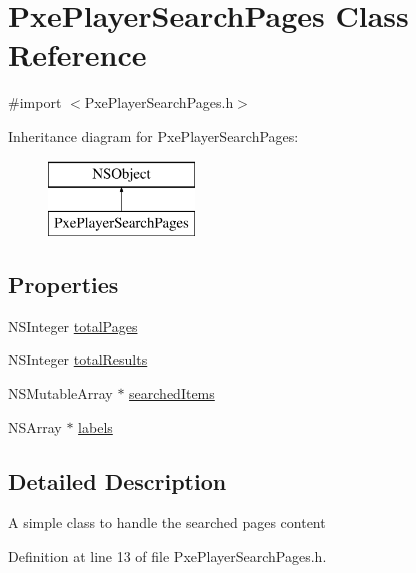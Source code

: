 \hypertarget{interface_pxe_player_search_pages}{\section{Pxe\-Player\-Search\-Pages Class Reference}
\label{interface_pxe_player_search_pages}
}


{\ttfamily \#import $<$Pxe\-Player\-Search\-Pages.\-h$>$}

Inheritance diagram for Pxe\-Player\-Search\-Pages\-:\begin{figure}[H]
\begin{center}
\leavevmode
\includegraphics[height=2.000000cm]{interface_pxe_player_search_pages}
\end{center}
\end{figure}
\subsection*{Properties}
\begin{DoxyCompactItemize}
\item 
N\-S\-Integer \hyperlink{interface_pxe_player_search_pages_ada69e63edca53b5ecf862d1b0568453e}{total\-Pages}
\item 
N\-S\-Integer \hyperlink{interface_pxe_player_search_pages_a780f08fec4487c31591628298e7f0bcd}{total\-Results}
\item 
N\-S\-Mutable\-Array $\ast$ \hyperlink{interface_pxe_player_search_pages_ab512213e84c5e0d03c73c7c86e74e903}{searched\-Items}
\item 
N\-S\-Array $\ast$ \hyperlink{interface_pxe_player_search_pages_a54907b85c2fa2e242a3032a7ff4b6bc5}{labels}
\end{DoxyCompactItemize}


\subsection{Detailed Description}
A simple class to handle the searched pages content 

Definition at line 13 of file Pxe\-Player\-Search\-Pages.\-h.



